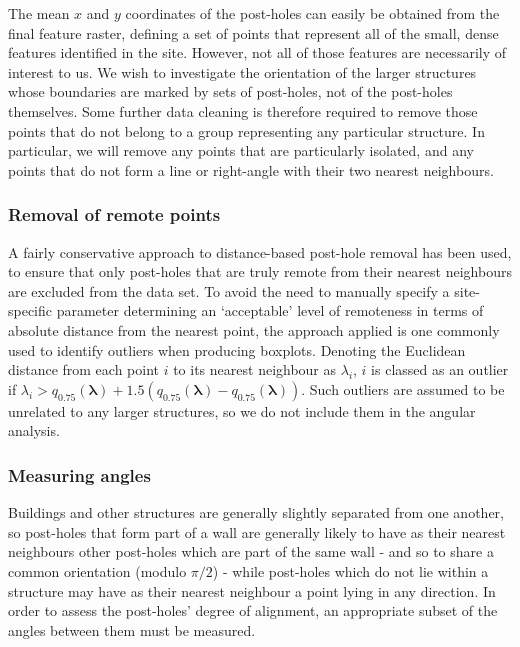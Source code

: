 \documentclass[../../ArchStats.tex]{subfiles}
\begin{document}
The mean $x$ and $y$ coordinates of the post-holes can easily be obtained from the final feature raster, defining a set of points that represent all of the small, dense features identified in the site. However, not all of those features are necessarily of interest to us. We wish to investigate the orientation of the larger structures whose boundaries are marked by sets of post-holes, not of the post-holes themselves. Some further data cleaning is therefore required to remove those points that do not belong to a group representing any particular structure. In particular, we will remove any points that are particularly isolated, and any points that do not form a line or right-angle with their two nearest neighbours.

\subsubsection{Removal of remote points}
\label{sec:filter-rectilinear}

A fairly conservative approach to distance-based post-hole removal has been used, to ensure that only post-holes that are truly remote from their nearest neighbours are excluded from the data set. To avoid the need to manually specify a site-specific parameter determining an `acceptable' level of remoteness in terms of absolute distance from the nearest point, the approach applied is one commonly used to identify outliers when producing boxplots. Denoting the Euclidean distance from each point $i$ to its nearest neighbour as $\lambda_i$, $i$ is classed as an outlier if $\lambda_i > q_{0.75}(\boldsymbol{\lambda}) + 1.5 \left(q_{0.75}(\boldsymbol{\lambda}) - q_{0.75}(\boldsymbol{\lambda}) \right)$. Such outliers are assumed to be unrelated to any larger structures, so we do not include them in the angular analysis.


\subsubsection{Measuring angles}

Buildings and other structures are generally slightly separated from one another, so post-holes that form part of a wall are generally likely to have as their nearest neighbours other post-holes which are part of the same wall - and so to share a common orientation (modulo $\pi/2$) - while post-holes which do not lie within a structure may have as their nearest neighbour a point lying in any direction. In order to assess the post-holes' degree of alignment, an appropriate subset of the angles between them must be measured.
\end{document}
